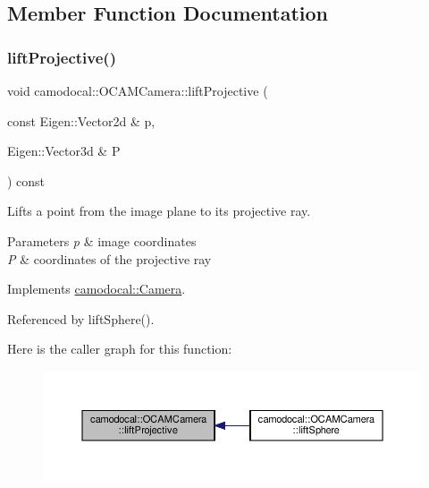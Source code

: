 \subsection{Member Function Documentation}
\mbox{\label{classcamodocal_1_1OCAMCamera_afb73e19397c8be1fb498004d0e926a53}} 
\subsubsection{\texorpdfstring{lift\+Projective()}{liftProjective()}}
{\footnotesize\ttfamily void camodocal\+::\+O\+C\+A\+M\+Camera\+::lift\+Projective (\begin{DoxyParamCaption}\item[{const Eigen\+::\+Vector2d \&}]{p,  }\item[{Eigen\+::\+Vector3d \&}]{P }\end{DoxyParamCaption}) const\hspace{0.3cm}{\ttfamily [virtual]}}



Lifts a point from the image plane to its projective ray. 


\begin{DoxyParams}{Parameters}
{\em p} & image coordinates \\
\hline
{\em P} & coordinates of the projective ray \\
\hline
\end{DoxyParams}


Implements \hyperlink{classcamodocal_1_1Camera_a680e97bfecab33cd833f914ee811d12d}{camodocal\+::\+Camera}.



Referenced by lift\+Sphere().

Here is the caller graph for this function\+:\nopagebreak
\begin{figure}[H]
\begin{center}
\leavevmode
\includegraphics[width=350pt]{classcamodocal_1_1OCAMCamera_afb73e19397c8be1fb498004d0e926a53_icgraph}
\end{center}
\end{figure}
\mbox{\label{classcamodocal_1_1OCAMCamera_a48112e1787548fc61c7545fc83ea2c81}} 
